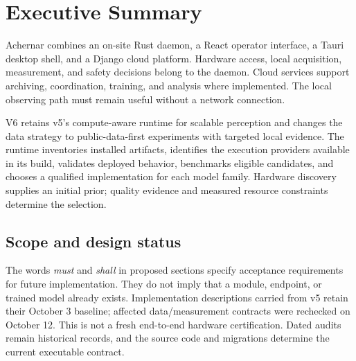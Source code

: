 \documentclass[11pt,a4paper]{article}
\begin{document}
\section{Executive Summary}
\label{sec:summary}
Achernar combines an on-site Rust daemon, a React operator interface, a Tauri
desktop shell, and a Django cloud platform. Hardware access, local acquisition,
measurement, and safety decisions belong to the daemon. Cloud services support
archiving, coordination, training, and analysis where implemented. The local
observing path must remain useful without a network connection.

V6 retains v5's compute-aware runtime for scalable perception and changes the
data strategy to public-data-first experiments with targeted local evidence.
The runtime inventories installed artifacts, identifies the execution providers
available in its build, validates deployed behavior, benchmarks eligible
candidates, and chooses a qualified implementation for each model family.
Hardware discovery supplies an initial prior; quality evidence and measured
resource constraints determine the selection.

\subsection{Scope and design status}
The words \emph{must} and \emph{shall} in proposed sections specify acceptance
requirements for future implementation. They do not imply that a module,
endpoint, or trained model already exists. Implementation descriptions carried from v5 retain their October 3
baseline; affected data/measurement contracts were rechecked on October 12.
This is not a fresh end-to-end hardware certification. Dated audits remain
historical records, and the source code and migrations determine the current
executable contract.
\end{document}
